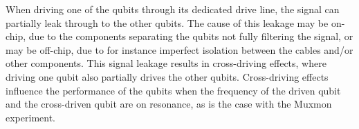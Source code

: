 
      When driving one of the qubits through its dedicated drive line, the signal can partially leak through to the other qubits. The cause of this leakage may be on-chip, due to the components separating the qubits not fully filtering the signal, or may be off-chip, due to for instance imperfect isolation between the cables and/or other components. This signal leakage results in cross-driving effects, where driving one qubit also partially drives the other qubits. Cross-driving effects influence the performance of the qubits when the frequency of the driven qubit and the cross-driven qubit are on resonance, as is the case with the Muxmon experiment.

